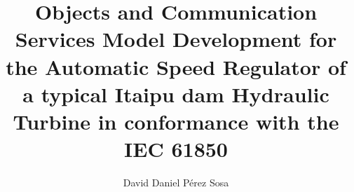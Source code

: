 %
%
%
%
%
%
% 
% 



\title{Objects and Communication Services Model Development 
for the Automatic Speed Regulator 
of a typical Itaipu dam Hydraulic Turbine 
in conformance with the IEC 61850}


\author{David Daniel P\'erez Sosa}

